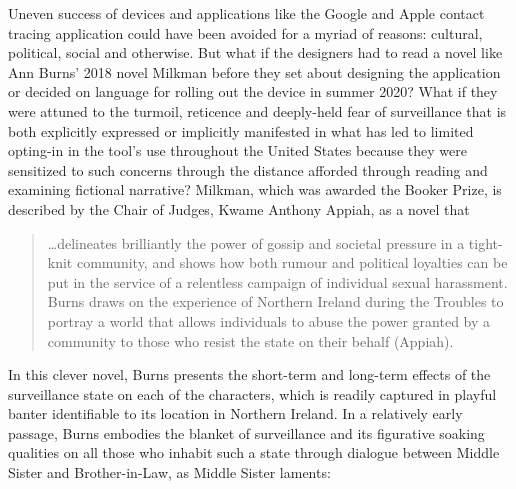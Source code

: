 \documentclass[11pt,dvipdfm]{article}
\begin{document}
Uneven success of devices and applications like the Google and Apple contact tracing application could have been avoided for a myriad of reasons: cultural, political, social and otherwise.  But what if the designers had to read a novel like Ann Burns' 2018 novel Milkman before they set about designing the application or decided on language for rolling out the device in summer 2020?  What if they were attuned to the turmoil, reticence and deeply-held fear of surveillance that is both explicitly expressed or implicitly manifested in what has led to limited opting-in in the tool’s use throughout the United States because they were sensitized to such concerns through the distance afforded through reading and examining fictional narrative?  Milkman, which was awarded the Booker Prize, is described by the Chair of Judges, Kwame Anthony Appiah, as a novel that
\begin{quote}
	\ldots delineates brilliantly the power of gossip and societal pressure in a tight-knit community, and shows how both rumour and political loyalties can be put in the service of a relentless campaign of individual sexual harassment.  Burns draws on the experience of Northern Ireland during the Troubles to portray a world that allows individuals to abuse the power granted by a community to those who resist the state on their behalf (Appiah).  
\end{quote}
In this clever novel, Burns presents the short-term and long-term effects of the surveillance state on each of the characters, which is readily captured in playful banter identifiable to its location in Northern Ireland.  In a relatively early passage, Burns embodies the blanket of surveillance and its figurative soaking qualities on all those who inhabit such a state through dialogue between Middle Sister and Brother-in-Law, as Middle Sister laments:
\end{document}

